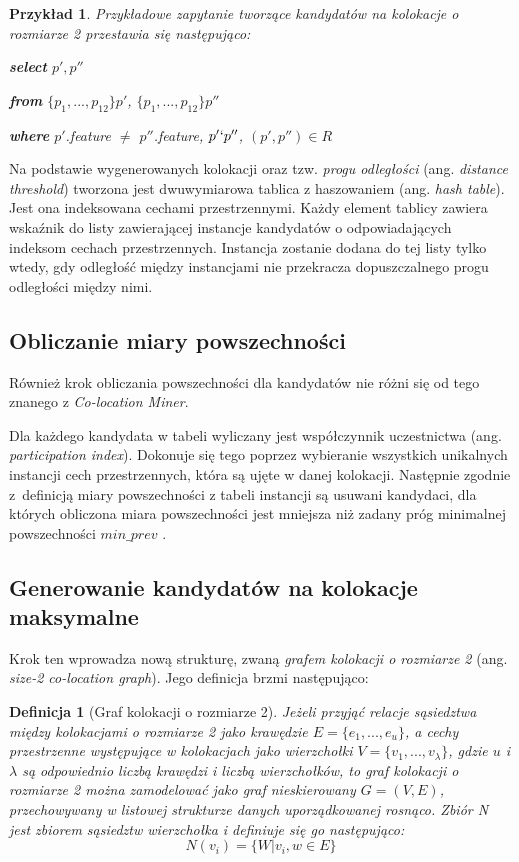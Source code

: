 \documentclass[12pt]{article}
\newtheorem{defin}{Definicja}
\newtheorem{sample}{Przykład}
\begin{document}
\begin{sample}Przykładowe zapytanie tworzące kandydatów na kolokacje o rozmiarze 2 przestawia się następująco:

\textbf{select} $ p', p''$

\textbf{from} $ \{p_{1},...,p_{12}\} p' $, $ \{p_{1},...,p_{12}\} p''$

\textbf{where}  $ p' $.feature $ \neq $ $ p'' $.feature, $ p' \lq p'' $, $(p', p'') \in R$
\end{sample}

Na podstawie wygenerowanych kolokacji oraz tzw. \textit{progu odległości} (ang. \textit{distance threshold}) tworzona jest dwuwymiarowa tablica z haszowaniem (ang. \textit{hash table}). Jest ona indeksowana cechami przestrzennymi. Każdy element tablicy zawiera wskaźnik do listy zawierającej instancje kandydatów o odpowiadających indeksom cechach przestrzennych. Instancja zostanie dodana do tej listy tylko wtedy, gdy odległość między instancjami nie przekracza dopuszczalnego progu odległości między nimi.

\subsection{Obliczanie miary powszechności}

Również krok obliczania powszechności dla kandydatów nie różni się od tego znanego z \textit{Co-location Miner}.

Dla każdego kandydata w tabeli wyliczany jest współczynnik uczestnictwa (ang. \textit{participation index}). Dokonuje się tego poprzez wybieranie wszystkich unikalnych instancji cech przestrzennych, która są ujęte w danej kolokacji. Następnie zgodnie z~definicją miary powszechności z tabeli instancji są usuwani kandydaci, dla których obliczona miara powszechności jest mniejsza niż zadany próg minimalnej powszechności $ min\_prev $ \cite{huang}. 

\subsection{Generowanie kandydatów na kolokacje maksymalne}

Krok ten wprowadza nową strukturę, zwaną \textit{grafem kolokacji o rozmiarze 2} (ang. \textit{size-2 co-location graph}). Jego definicja brzmi następująco:

\begin{defin}[Graf kolokacji o rozmiarze 2]
Jeżeli przyjąć relacje sąsiedztwa między kolokacjami o rozmiarze 2 jako krawędzie $ E = \{e_{1},...,e_{u}\}$, a cechy przestrzenne występujące w kolokacjach jako wierzchołki $ V = \{v_{1},...,v_{\lambda}\}$, gdzie $ u $ i $ \lambda $ są odpowiednio liczbą krawędzi i liczbą wierzchołków, to graf kolokacji o rozmiarze 2 można zamodelować jako graf nieskierowany $ G= (V, E)$, przechowywany w listowej strukturze danych uporządkowanej rosnąco. Zbiór N jest zbiorem sąsiedztw wierzchołka i definiuje się go następująco:
\begin{equation}
N(v_{i}) = \{W|{v_{i},w} \in E\}
\end{equation}
\label{def:size2-col-graph}
\end{defin}
\end{document}

